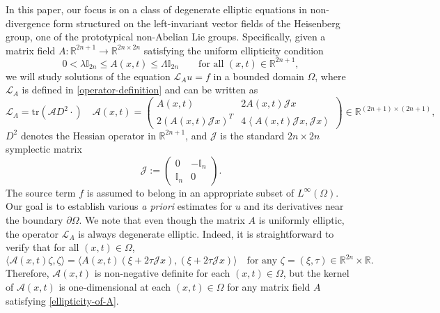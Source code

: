 \documentclass[12pt]{amsart}
\newcommand{\Lop}{\mathcal{L}}
\newcommand{\R}{{\mathbb R}}
\newcommand{\J}{\mathcal{J}}
\newcommand{\la}{\left\langle}
\newcommand{\ra}{\right\rangle}
\def \tr {\mathrm{tr}}
\def \L {\mathcal{L}}
\def \O {\Omega}
\def \t {\tau}
\def \la {\left\langle }
\def \ra {\right\rangle}
\def \tr {\mathrm{tr}}
\begin{document}
In this paper, our focus is on a class of degenerate elliptic equations in non-divergence form structured on the left-invariant vector fields of the Heisenberg group, one of the prototypical non-Abelian Lie groups. Specifically, given a matrix field $A : \R^{2n+1} \to \R^{2n \times 2n}$ satisfying the uniform ellipticity condition
\begin{equation}\label{ellipticity-of-A}
0<\lambda \mathbb{I}_{2n}\leq A(x,t) \leq \Lambda \mathbb{I}_{2n} \qquad \text{for all } (x,t) \in \R^{2n+1},
\end{equation}
we will study solutions of the equation $\Lop_A u = f$ in a bounded domain $\O$, where $\L_A$ is defined in \eqref{operator-definition} and can be written as
\begin{equation}\label{L-in-coords}
\L_A = \tr \left(\mathcal{A} D^2 \cdot \right) \quad  
\mathcal{A}(x, t) = \left( \begin{array}{cc}
A(x,t) & 2 A(x,t) \J x \\
2 (A(x,t) \J x)^T & 4 \la A(x,t) \J x, \J x \ra \end{array} \right) \in \R^{(2n+1)\times(2n+1)},
\end{equation}
$D^2$ denotes the Hessian operator in $\R^{2n+1}$, and $\J$ is the standard $2n \times 2n$ symplectic matrix 
\begin{equation}\label{standard-symplectic}
\J := \left( \begin{array}{cc}
0 & -\mathbb{I}_n \\
\mathbb{I}_n & 0 \end{array} \right).
\end{equation}
The source term $f$ is assumed to belong in an appropriate subset of $L^{\infty}(\O)$. Our goal is to establish various \emph{a priori} estimates for $u$ and its derivatives near the boundary $\partial \O$. We note that even though the matrix $A$ is uniformly elliptic, the operator $\Lop_A$ is always degenerate elliptic. Indeed, it is straightforward to verify that for all $(x,t) \in \O$, 
\[
\langle\mathcal{A}(x,t) \zeta,\zeta\rangle = \langle A(x,t)(\xi + 2\t \J x), (\xi + 2\t \J x)\rangle \quad \text{for any } \zeta = (\xi, \t) \in \R^{2n} \times \R.
\]
Therefore, $\mathcal{A}(x,t)$ is non-negative definite for each $(x,t) \in \O$, but the kernel of $\mathcal{A}(x,t)$ is one-dimensional at each $(x,t) \in \O$ for any matrix field $A$ satisfying \eqref{ellipticity-of-A}.
\end{document}
